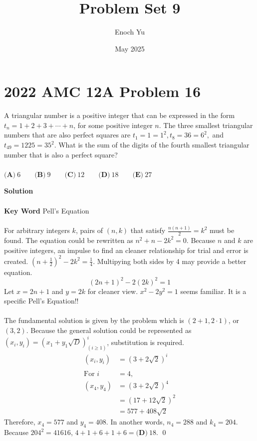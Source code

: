 \documentclass{article}
\title{Problem Set 9}
\author{Enoch Yu}
\date{May 2025}
\newenvironment{solution}{\begin{trivlist}\item[]{\bf Solution}}{\qed \end{trivlist}}
\begin{document}
\section*{2022 AMC 12A Problem 16}
A triangular number is a positive integer that can be expressed in the form $t_n=1+2+3+\cdots+n$, for some positive integer $n$. The three smallest triangular numbers that are also perfect squares are $t_1=1=1^2, t_8=36=6^2,$ and $t_{49}=1225=35^2$. What is the sum of the digits of the fourth smallest triangular number that is also a perfect square?
\\\\
$\textbf{(A)} ~6 \qquad\textbf{(B)} ~9 \qquad\textbf{(C)} ~12 \qquad\textbf{(D)} ~18 \qquad\textbf{(E)} ~27$
\begin{solution}
\\\\
\textbf{Key Word} Pell's Equation
\\\\
For arbitrary integers $k$, pairs of $(n,k)$ that satisfy $\frac{n(n+1)}{2}=k^2$ must be found. The equation could be rewritten as $n^2+n-2k^2=0$. Because $n$ and $k$ are positive integers, an impulse to find an cleaner relationship for trial and error is created. $(n+\frac{1}{2})^2-2k^2=\frac{1}{4}$. Multipying both sides by 4 may provide a better equation.
\[
(2n+1)^2-2(2k)^2=1
\]
Let $x=2n+1$ and $y=2k$ for cleaner view. $x^2-2y^2=1$ seems familiar. It is a specific Pell's Equation!!
\\\\
The fundamental solution is given by the problem which is $(2+1, 2\cdot1)$, or $(3,2)$. Because the general solution could be represented as $(x_i,y_i)=(x_1+y_1\sqrt{D})^i_{(i\ge1)}$, substitution is required.
\begin{align*}
(x_i,y_i)&=(3+2\sqrt{2})^i
\\\\
\text{For }i&=4, \\
(x_4,y_4)
&=(3+2\sqrt{2})^4 \\
&=(17+12\sqrt{2})^2 \\
&=577+408\sqrt{2}
\end{align*}
Therefore, $x_4=577$ and $y_4=408$. In another words, $n_4=288$ and $k_4=204$. Because $204^2=41616$, $4+1+6+1+6=\boxed{\textbf{(D)} ~18}$.
\end{solution}

\newpage
\end{document}

